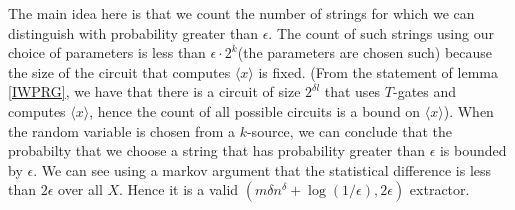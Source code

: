 The main idea here is that we count the number of strings for which we can distinguish with probability greater than $\epsilon$. The count of such strings using our choice of parameters is less than $\epsilon \cdot 2^k$(the parameters are chosen such) because the size of the circuit that computes $\langle x \rangle $ is fixed. (From the statement of lemma \ref{IWPRG}, we have that there is a circuit of size $2^{\delta l}$ that uses $T$-gates and computes $\langle x \rangle$, hence the count of all possible circuits is a bound on $\langle x \rangle$). When the random variable is chosen from a $k$-source, we can conclude that the probabilty that we choose a string that has probability greater than $\epsilon$ is bounded by $\epsilon$. We can see using a markov argument that the statistical difference is less than $2\epsilon$ over all $X$. Hence it is a valid $(m\delta n^\delta + \log (1/\epsilon),2\epsilon)$ extractor. 